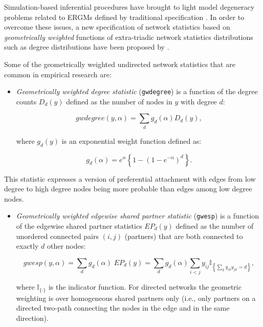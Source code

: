 \documentclass[]{book}
\providecommand{\tightlist}{%
  \setlength{\itemsep}{0pt}\setlength{\parskip}{0pt}}
\begin{document}
Simulation-based inferential procedures have brought to light model
degeneracy problems related to ERGMs defined by traditional
specification \citep{sch11}. In order to overcome these issues, a new
specification of network statistics based on \emph{geometrically
weighted} functions of extra-triadic network statistics distributions
such as degree distributions have been proposed by
\citet{sni:pat:rob:han06}.

Some of the geometrically weighted undirected network statistics that
are common in empirical research are:

\begin{itemize}
\tightlist
\item
  \emph{Geometrically weighted degree statistic} (\texttt{gwdegree}) is
  a function of the degree counts \(D_d (y)\) defined as the number of
  nodes in \(y\) with degree \(d\):

  \begin{equation*}
  gwdegree(y, \alpha) = 
  \sum_d g_d (\alpha) D_d (y),
  \end{equation*}

  where \(g_d (y)\) is an exponential weight function defined as:

  \begin{equation*}
  g_d (\alpha) = e^{\alpha} \left\{ 1 - \left( 1 - e ^{-\alpha} \right)^{d} \right\}. 
  \end{equation*}
\end{itemize}

This statistic expresses a version of preferential attachment
\citep{alb:bar02} with edges from low degree to high degree nodes being
more probable than edges among low degree nodes.

\begin{itemize}
\tightlist
\item
  \emph{Geometrically weighted edgewise shared partner statistic}
  (\texttt{gwesp}) is a function of the edgewise shared partner
  statistics \(EP_d (y)\) defined as the number of unordered connected
  pairs \((i, j)\) (partners) that are both connected to exactly \(d\)
  other nodes:

  \begin{equation*}
  gwesp(y, \alpha) =
  \sum_d g_d (\alpha) \; EP_d (y) =
  \sum_d g_d (\alpha) \sum_{i < j} y_{ij} \mathbb{I}_{ \left\{ \sum_k y_{ik} y_{jk} = d  \right\} },
  \end{equation*}

  where \(\mathbb{I}_{\lbrace \cdot \rbrace}\) is the indicator
  function. For directed networks the geometric weighting is over
  homogeneous shared partners only (i.e., only partners on a directed
  two-path connecting the nodes in the edge and in the same direction).
\end{itemize}
\end{document}
